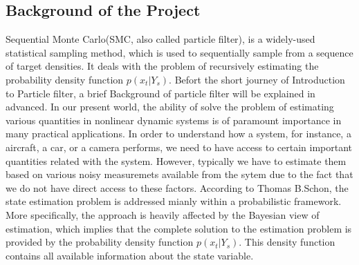 \documentclass[11pt,oneside,a4paper]{article}
\begin{document}
\subsection{Background of the Project}
Sequential Monte Carlo(SMC, also called particle filter), is a widely-used statistical sampling method, which is
used to sequentially sample from a sequence of target densities. It deals with the problem of recursively estimating
the probability density function $ p(x_t|Y_s) $.
\newline Befort the short journey of Introduction to Particle filter, a brief Background of particle filter will be explained in advanced. In our present world, the ability
of solve the problem of estimating various quantities in nonlinear dynamic systems is of paramount importance in many
practical applications. In order to understand how a system, for instance, a aircraft, a car, or a camera performs, we
need to have access to certain important quantities related with the system. However, typically we have to estimate them
based on various noisy measuremets available from the sytem due to the fact that we do not have direct access to these factors.
According to Thomas B.Schon, the state estimation problem is addressed mianly within a probabilistic framework. More specifically,
the approach is heavily affected by the Bayesian view of estimation, which implies that the complete solution to the
estimation problem is provided by the probability density function $ p(x_t|Y_s) $. This density function contains all available
information about the state variable.
\end{document}
